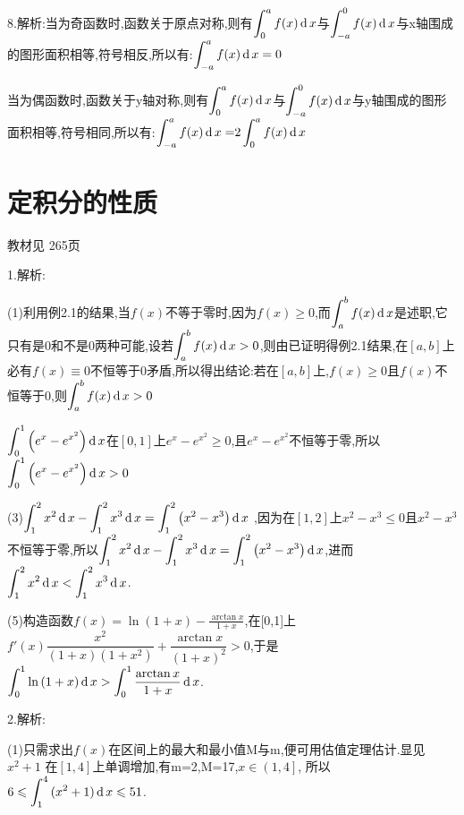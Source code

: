 8.解析:当为奇函数时,函数关于原点对称,则有$\displaystyle\int_0^a {f(x)\operatorname{\mathop{}\!\mathrm{d}} x} $与$\displaystyle\int_{ - a}^0 {f(x)\operatorname{\mathop{}\!\mathrm{d}} x} $与x轴围成的图形面积相等,符号相反,所以有:$\displaystyle\int_{ - a}^a {f(x)\operatorname{\mathop{}\!\mathrm{d}} x = 0} $

当为偶函数时,函数关于y轴对称,则有$\displaystyle\int_0^a {f(x)\operatorname{\mathop{}\!\mathrm{d}} x} $与$\displaystyle\int_{ - a}^0 {f(x)\operatorname{\mathop{}\!\mathrm{d}} x} $与y轴围成的图形面积相等,符号相同,所以有:$\displaystyle\int_{ - a}^a {f(x)\operatorname{\mathop{}\!\mathrm{d}} x = } 2\displaystyle\int_0^a {f(x)\operatorname{\mathop{}\!\mathrm{d}} x} $


\section{定积分的性质}
\begin{flushright}
  \color{zhanqing!80}
   教材见 265页 %
\end{flushright}
1.解析:

(1)利用例2.1的结果,当$f(x)$不等于零时,因为$f\left( x \right) \geqslant 0$,而$\displaystyle\int_a^b {f(x)\operatorname{\mathop{}\!\mathrm{d}} x} $是述职,它只有是0和不是0两种可能,设若$\displaystyle\int_a^b {f(x)\operatorname{\mathop{}\!\mathrm{d}} x} > 0$,则由已证明得例2.1结果,在$[a,b]$上必有$f\left( x \right) \equiv 0$不恒等于0矛盾,所以得出结论:若在$[a,b]$上,$f\left( x \right) \geqslant 0$且$f(x)$不恒等于0,则$\displaystyle\int_a^b {f(x)\operatorname{\mathop{}\!\mathrm{d}} x}  > 0$

$\displaystyle\int_0^1 {\left( {{e^x} - {e^{{x^2}}}} \right)} \operatorname{\mathop{}\!\mathrm{d}} x$在$[0,1]$上${e^x} - {e^{{x^2}}} \geqslant 0$,且${e^x} - {e^{{x^2}}} $不恒等于零,所以$\displaystyle\int_0^1 {\left( {{e^x} - {e^{{x^2}}}} \right)} \operatorname{\mathop{}\!\mathrm{d}} x > 0$

(3)$\displaystyle\int_1^2 {{x^2}} \operatorname{\mathop{}\!\mathrm{d}} x - \displaystyle\int_1^2 {{x^3}} \operatorname{\mathop{}\!\mathrm{d}} x = \displaystyle\int_1^2 {\left( {{x^2} - {x^3}} \right)} \operatorname{\mathop{}\!\mathrm{d}} x$ ,因为在$[1,2]$上${x^2} - {x^3} \leqslant 0$且${x^2} - {x^3}$不恒等于零,所以$\displaystyle\int_1^2 {{x^2}} \operatorname{\mathop{}\!\mathrm{d}} x - \displaystyle\int_1^2 {{x^3}} \operatorname{\mathop{}\!\mathrm{d}} x = \displaystyle\int_1^2 {\left( {{x^2} - {x^3}} \right)} \operatorname{\mathop{}\!\mathrm{d}} x$,进而$\displaystyle\int_1^2 {{x^2}} \operatorname{\mathop{}\!\mathrm{d}} x < \displaystyle\int_1^2 {{x^3}} \operatorname{\mathop{}\!\mathrm{d}} x$.

(5)构造函数$f\left( x \right) = \ln \left( {1 + x} \right) - \frac{{\arctan x}}{{1 + x}}$,在[0,1]上$f'\left( x \right)\dfrac{{{x^2}}}{{\left( {1 + x} \right)\left( {1 + {x^2}} \right)}} + \dfrac{{\arctan x}}{{{{\left( {1 + x} \right)}^2}}} > 0$,于是$\displaystyle\int_0^1 {\ln \left( {1 + x} \right)\operatorname{\mathop{}\!\mathrm{d}} x}  > \displaystyle\int_0^1 {\dfrac{{\arctan x}}{{1 + x}}\operatorname{\mathop{}\!\mathrm{d}} x} $.

2.解析:

(1)只需求出$f(x)$在区间上的最大和最小值M与m,便可用估值定理估计.显见${x^2} + 1$
在$[1,4]$上单调增加,有m=2,M=17,$x \in \left( {1,4} \right]$,
所以$6 \leqslant \displaystyle\int_1^4 {({x^2} + 1)\operatorname{\mathop{}\!\mathrm{d}} x}   \leqslant 51 $.

